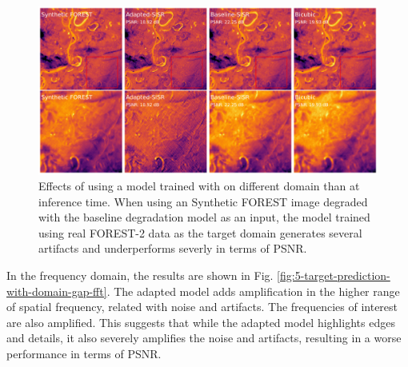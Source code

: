        \begin{figure}[H]
            \centering
            \includegraphics[scale=0.28]{Includes/5-target-prediction-with-domain-gap.pdf}
            \caption{Effects of using a model trained with on different domain than at inference time. 
                     When using an Synthetic FOREST image degraded with the baseline degradation model as an input, the model trained using real FOREST-2 data as the target domain generates several artifacts and underperforms severly in terms of PSNR. }
            \label{fig:5-target-prediction-with-domain-gap}
        \end{figure}

        In the frequency domain, the results  are shown in Fig. \ref{fig:5-target-prediction-with-domain-gap-fft}.  
        The adapted model adds amplification in the higher range of spatial frequency, related with noise and artifacts.
        The frequencies of interest are also amplified.
        This suggests that while the adapted model highlights edges and details, it also severely amplifies the noise and artifacts, resulting in a worse performance in terms of PSNR.
        

